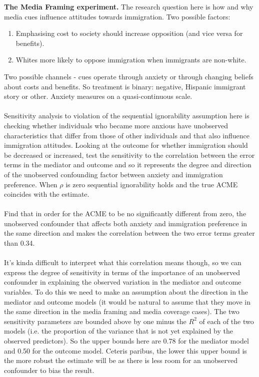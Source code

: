 \documentclass{article}
\begin{document}
	\textbf{The Media Framing experiment.} The research question here is how and why media cues influence attitudes towards immigration. Two possible factors:
	\begin{enumerate}
		\item Emphasising cost to society should increase opposition (and vice versa for benefits). 
		\item Whites more likely to oppose immigration when immigrants are non-white. 
	\end{enumerate}
	Two possible channels - cues operate through anxiety or through changing beliefs about costs and benefits. So treatment is binary: negative, Hispanic immigrant story or other. Anxiety measures on a quasi-continuous scale. 
	\\~\\
	Sensitivity analysis to violation of the sequential ignorability assumption here is checking whether individuals who became more anxious have unobserved  characteristics that differ from those of other individuals and that also influence immigration attitudes. Looking at the outcome for whether immigration should be decreased or increased, test the sensitivity to the correlation between the error terms in the mediator and outcome and so it represents the degree and direction of the unobserved confounding factor between anxiety and immigration preference. When $\rho$ is zero sequential ignorability holds and the true ACME coincides with the estimate. 
	\\~\\
	Find that in order for the ACME to be no significantly different from zero, the unobserved confounder that affects both anxiety and immigration preference in the same direction and makes the correlation between the two error terms greater than 0.34. 	
	\\~\\
	It's kinda difficult to interpret what this correlation means though, so we can express the degree of sensitivity in terms of the importance of an unobserved confounder in explaining the observed variation in the mediator and outcome variables. To do this we need to make an assumption about the direction in the mediator and outcome models (it would be natural to assume that they move in the same direction in the media framing and media coverage cases). The two sensitivity parameters are bounded above by one minus the $R^2$ of each of the two models (i.e. the proportion of the variance that is not yet explained by the observed predictors). So the upper bounds here are 0.78 for the mediator model and 0.50 for the outcome model. Ceteris paribus, the lower this upper bound is the more robust the estimate will be as there is less room for an unobserved confounder to bias the result. 
\end{document}

